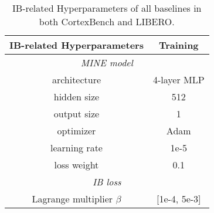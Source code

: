 \begin{table*}[ht]
\centering
\caption{IB-related Hyperparameters of all baselines in both CortexBench and LIBERO.
}
\begin{tabular}{cc}
\toprule
IB-related Hyperparameters & Training \\
\toprule
\multicolumn{2}{c}{\textit{MINE model}} \\
\midrule
architecture & 4-layer MLP \\
hidden size & 512 \\
output size & 1 \\
optimizer & Adam \\
learning rate & 1e-5 \\
loss weight & 0.1 \\
\midrule
\multicolumn{2}{c}{\textit{IB loss}} \\
\midrule
Lagrange multiplier $\beta$ & [1e-4, 5e-3] \\
\bottomrule
\end{tabular}
\label{tab:appendix_ib_para}
\end{table*}